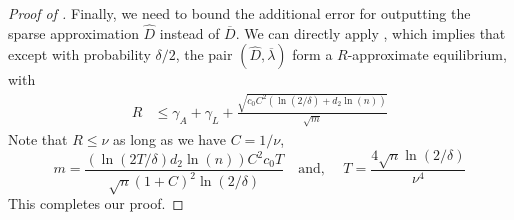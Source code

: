 \begin{proof}[Proof of ]
  Finally, we need to bound the additional error for outputting the
  sparse approximation $\hat D$ instead of $\overline D$. We can
  directly apply , which implies that except
  with probability $\delta/2$, the pair $(\hat D, \overline \lambda)$
  form a $R$-approximate equilibrium, with
  \begin{align*}
    R &\leq \gamma_A + \gamma_L + \frac{\sqrt{c_0 C^2(\ln(2/\delta)
        +d_2\ln(n))}}{\sqrt{m}}
  \end{align*}
  Note that $R\leq \nu$ as long as we have $C = 1/\nu$,
  \[
    m = \frac{\left(\ln(2T/\delta)d_2\ln(n)\right) C^2 c_0 T}{\sqrt{n} (1+C)^2 \ln(2/\delta)}
 \quad
    \mbox{and, }\quad T = \frac{4\sqrt{n} \ln(2/\delta)}{\nu^4}
  \]
 This completes our proof.
\end{proof}












